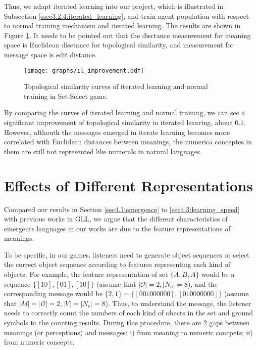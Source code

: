 Thus, we adapt iterated learning into our project, which is illustrated in Subsection \ref{ssec3.2.4:iterated_learning}, and train agent population with respect to normal training mechanism and iterated learning. The results are shown in Figure \ref{fig4.4:il_improve}. It needs to be pointed out that the disctance measurement for meaning space is Euclidean disctance for topological similarity, and measurement for message space is edit distance.

\begin{figure}[!h]
    \centering
    \texttt{[image: graphs/il\_improvement.pdf]}
    \caption{Topological similarity curves of iterated learning and normal training in Set-Select game.}
    \label{fig4.4:il_improve}
\end{figure}

By comparing the curves of iterated learning and normal training, we can see a significant improvement of topological similarity in iterated leanring, about $0.1$. However, althouth the messages emerged in iterate learning becomes more correlated with Euclidean distances between meanings, the numerica conceptes in them are still not represented like numerals in natural languages.


\section{Effects of Different Representations}
\label{sec4.4:represent_effect}

Compared our results in Section \ref{sec4.1:emergence} to \ref{sec4.3:learning_speed} with previous works in GLL, we argue that the different characteristics of emergents languages in our works are due to the feature representations of meanings.

To be specific, in our games, listeners need to generate object sequences or select the correct object sequence according to features representing each kind of objects. For example, the feature representation of set $\{A, B, A\}$ would be a sequence $\{[1 0], [0 1], [1 0]\}$ (assume that $|\mathcal{O}|=2, |N_o|=8$), and the corresponding message would be $\{2, 1\}=\{[0 0 1 0 0 0 0 0 0], [0 1 0 0 0 0 0 0 0]\}$ (assume that $|M|=|\mathcal{O}|=2, |V|=|N_o|=8$). Thus, to understand the message, the listener needs to correctly count the numbers of each kind of obects in the set and ground symbols to the counting results. During this procedure, there are 2 gaps between meanings (or perceptions) and messages: i) from meaning to numeric concpets; ii) from numeric concepts.

